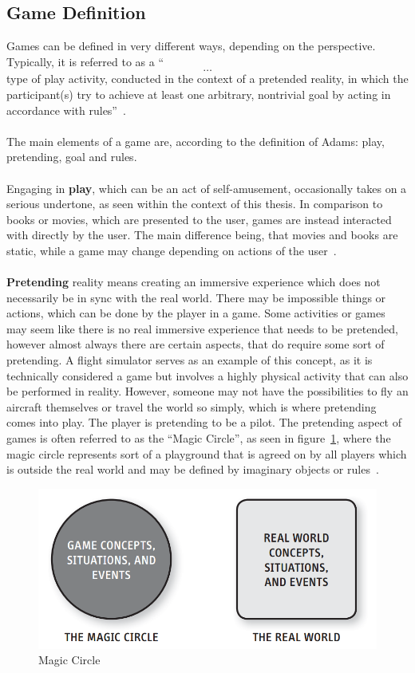 \subsection{Game Definition}\label{subsec:game-definition}
Games can be defined in very different ways, depending on the perspective.
Typically, it is referred to as a ``\[\ldots\] type of play activity, conducted in the context of a pretended reality, in which the participant(s)
try to achieve at least one arbitrary, nontrivial goal by acting in accordance with rules''~\cite[p.~3]{10.5555/2544002}.
\\
\\
The main elements of a game are, according to the definition of Adams: play, pretending, goal and rules.
\\
\\
Engaging in \textbf{play}, which can be an act of self-amusement, occasionally takes on a serious undertone, as seen within the context of this thesis.
In comparison to books or movies, which are presented to the user, games are instead interacted with directly by the user.
The main difference being, that movies and books are static, while a game may change depending on actions of the user~\cite[p.~4-9]{10.5555/2544002}.
\\
\\
\textbf{Pretending} reality means creating an immersive experience which does not necessarily be in sync with the real world.
There may be impossible things or actions, which can be done by the player in a game.
Some activities or games may seem like there is no real immersive experience that needs to be pretended, however almost always there are certain
aspects, that do require some sort of pretending.
A flight simulator serves as an example of this concept, as it is technically considered a game but involves a highly physical activity that can also be performed in reality.
However, someone may not have the possibilities to fly an aircraft themselves or travel the world so simply, which is where pretending comes into play.
The player is pretending to be a pilot.
The pretending aspect of games is often referred to as the ``Magic Circle'', as seen in figure~\ref{fig:magic-circle}, where the magic circle represents sort of a
playground that is agreed on by all players which is outside the real world and may be defined by imaginary objects or rules~\cite[p.~4-9]{10.5555/2544002}.
\begin{figure}
    \centering
    \includegraphics[width=\textwidth]{./Pictures/res/fundamentals/magic-circle}
    \caption{Magic Circle~\cite[p.~5]{10.5555/2544002}}
    \label{fig:magic-circle}
\end{figure}
